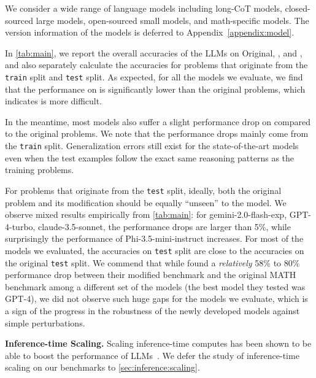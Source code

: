 We consider a wide range of language models including long-CoT models, closed-sourced large models, open-sourced small models, and math-specific models. The version information of the models is deferred to Appendix~\ref{appendix:model}.

In \cref{tab:main}, we report the overall accuracies of the LLMs on Original, \SAME, and \HARD, and also separately calculate the accuracies for problems that originate from the \texttt{train} split and \texttt{test} split.
As expected, for all the models we evaluate, we find that the performance on \HARD is significantly lower than the original problems, which indicates \HARD is more difficult. 

In the meantime, most models also suffer a slight performance drop on \SAME compared to the original problems. We note that the performance drops mainly come from the \texttt{train} split. Generalization errors still exist for the state-of-the-art models even when the test examples follow the exact same reasoning patterns as the training problems.  




For problems that originate from the \texttt{test} split, ideally, both the original problem and its \SAME modification should be equally ``unseen'' to the model. We observe mixed results empirically from \cref{tab:main}: for gemini-2.0-flash-exp, GPT-4-turbo, claude-3.5-sonnet, the performance drops are larger than 5\%, while surprisingly the performance of Phi-3.5-mini-instruct increases. For most of the models we evaluated, the accuracies on \SAME \texttt{test} split are close to the accuracies on the original \texttt{test} split. 
We commend that while \citet{srivastava2024functional} found a \textit{relatively} 58\% to 80\% performance drop between their modified benchmark and the original MATH benchmark among a different set of the models (the best model they tested was GPT-4), we did not observe such huge gaps for the models we evaluate, which is a sign of the progress in the robustness of the newly developed models against simple perturbations.





\textbf{Inference-time Scaling.}  Scaling inference-time computes has been shown to be able to boost the performance of LLMs~\citep{wang2022self, brown2024large, wu2024empirical, cobbe2021training, lightman2023let}. We defer the study of inference-time scaling on our benchmarks to \cref{sec:inference:scaling}. 








